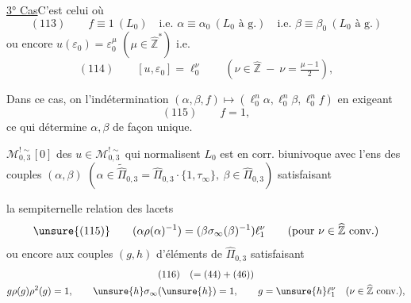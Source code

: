 \uline{3° Cas}\quad C'est celui où
\[
 (113)\qquad
 f\equiv1\ (L_0)
 \quad\text{i.e. }\alpha\equiv\alpha_0\ (L_0\text{ à g.})
 \quad\text{i.e. }\beta\equiv\beta_0\ (L_0\text{ à g.})
\]
ou encore $u(\varepsilon_0)=\varepsilon_0^\mu$
$(\mu\in\widehat{\mathbb Z}^{*})$ i.e.
\[
 (114)\qquad
 [u,\varepsilon_0]=\ell_0^\nu
 \qquad
 (\nu\in\widehat{\mathbb Z}\ -\ \nu=\tfrac{\mu-1}{2}),
\]


Dans ce cas, on  l'indétermination
$(\alpha,\beta,f)\longmapsto
(\ell_0^n\alpha,\ell_0^n\beta,\ell_0^n f)$
en exigeant
\[
 (115)\qquad f=1,
\]
ce qui détermine $\alpha,\beta$ de façon unique.

$\mathcal M_{0,3}^{!\sim}[0]$ des $u\in\mathcal M_{0,3}^{!\sim}$
qui normalisent $L_0$ est en corr. biunivoque avec l'ens des couples
$(\alpha,\beta)$
$(\alpha\in\widetilde{\widehat{\Pi}}_{0,3}
=\widehat{\Pi}_{0,3}\cdot\{1,\tau_\infty\},
\ \beta\in\widehat{\Pi}_{0,3})$ satisfaisant



la sempiternelle relation des lacets
\[
 \unsure{(115)}\qquad
 (\alpha\rho(\alpha)^{-1})
 =(\beta\sigma_\infty(\beta)^{-1})\ell_1^\nu
 \qquad(\text{pour }\nu\in\widehat{\mathbb Z}\text{ conv.})
\]
ou encore aux couples $(g,h)$
d'éléments de $\widehat{\Pi}_{0,3}$ satisfaisant
\[
 \begin{gathered}
 (116)\quad (=(44)+(46))\\
 g\rho(g)\rho^2(g)=1,\qquad
 \unsure{h}\sigma_\infty(\unsure{h})=1,\qquad
 g=\unsure{h}\ell_1^\nu\quad
 (\nu\in\widehat{\mathbb Z}\text{ conv.}),
 \end{gathered}
\]


